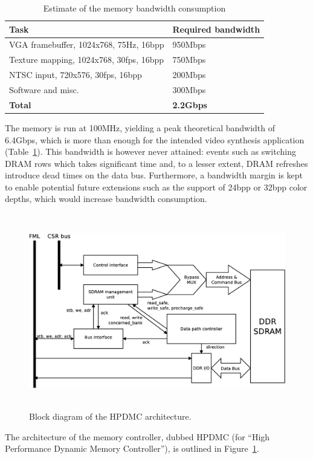 \documentclass[a4paper,11pt]{kthesis}
\begin{document}
\begin{table}
\centering
\begin{tabular}{|l|l|}
\hline
\textbf{Task} & \textbf{Required bandwidth} \\
\hline
VGA framebuffer, 1024x768, 75Hz, 16bpp & 950Mbps \\
\hline
Texture mapping, 1024x768, 30fps, 16bpp & 750Mbps \\
\hline
NTSC input, 720x576, 30fps, 16bpp & 200Mbps \\
\hline
Software and misc. & 300Mbps \\
\hline
\textbf{Total} & \textbf{2.2Gbps} \\
\hline
\end{tabular}
\label{tab:membw}
\caption{Estimate of the memory bandwidth consumption}
\end{table}

The memory is run at 100MHz, yielding a peak theoretical bandwidth of 6.4Gbps, which is more than enough for the intended video synthesis application (Table~\ref{tab:membw}). This bandwidth is however never attained: events such as switching DRAM rows which takes significant time and, to a lesser extent, DRAM refreshes introduce dead times on the data bus. Furthermore, a bandwidth margin is kept to enable potential future extensions such as the support of 24bpp or 32bpp color depths, which would increase bandwidth consumption.

\begin{figure}[H]
\centering
\includegraphics[height=85mm]{hpdmc_block.eps}
\caption{Block diagram of the HPDMC architecture.}\label{fig:hpdmc_block}
\end{figure}

The architecture of the memory controller, dubbed HPDMC (for ``High Performance Dynamic Memory Controller''), is outlined in Figure~\ref{fig:hpdmc_block}.
\end{document}
